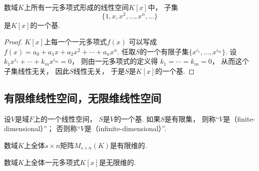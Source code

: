 \begin{example}
数域\(K\)上所有一元多项式形成的线性空间\(K[x]\)中，
子集\[
	\{1,x,x^2,\dotsc,x^n,\dotsc\}
\]是\(K[x]\)的一个基.
\begin{proof}
\(K[x]\)上每一个一元多项式\(f(x)\)
可以写成\(f(x)=a_0+a_1 x+a_2 x^2+\dotsb+a_n x^n\).
任取\(S\)的一个有限子集\(\{x^{i_1},\dotsc,x^{i_m}\}\).
设\(k_1 x^{i_1}+\dotsb+k_m x^{i_m}=0\)，
则由一元多项式的定义得
\(k_1=\dotsb=k_m=0\)，
从而这个子集线性无关，
因此\(S\)线性无关，
于是\(S\)是\(K[x]\)的一个基.
\end{proof}
\end{example}

\subsection{有限维线性空间，无限维线性空间}
\begin{definition}
设\(V\)是域\(F\)上的一个线性空间，
\(S\)是\(V\)的一个基.
如果\(S\)是有限集，
则称“\(V\)是（finite-dimensional）”；
否则称“\(V\)是（infinite-dimensional）”.
\end{definition}

\begin{example}
数域\(K\)上全体\(s \times n\)矩阵\(M_{s \times n}(K)\)是有限维的.
\end{example}

\begin{example}
数域\(K\)上全体一元多项式\(K[x]\)是无限维的.
\end{example}

